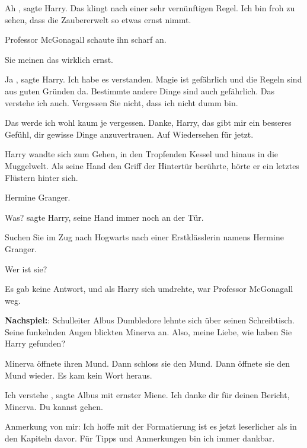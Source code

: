\glqq Ah\grqq{} , sagte Harry. \glqq Das klingt nach einer sehr vernünftigen
Regel. Ich bin froh zu sehen, dass die Zaubererwelt so etwas ernst
nimmt.\grqq{}

Professor McGonagall schaute ihn scharf an.

\glqq Sie meinen das wirklich ernst.\grqq{}

\glqq Ja\grqq{} , sagte Harry. \glqq Ich habe es verstanden. Magie ist
gefährlich und die Regeln sind aus guten Gründen da. Bestimmte andere Dinge
sind auch gefährlich. Das verstehe ich auch. Vergessen Sie nicht, dass ich
nicht dumm bin.\grqq{}

\glqq Das werde ich wohl kaum je vergessen. Danke, Harry, das gibt mir ein
besseres Gefühl, dir gewisse Dinge anzuvertrauen. Auf Wiedersehen für
jetzt.\grqq{}

Harry wandte sich zum Gehen, in den Tropfenden Kessel und hinaus in die
Muggelwelt. Als seine Hand den Griff der Hintertür berührte, hörte er ein
letztes Flüstern hinter sich.

\glqq Hermine Granger.\grqq{}

\glqq Was?\grqq{} sagte Harry, seine Hand immer noch an der Tür.

\glqq Suchen Sie im Zug nach Hogwarts nach einer Erstklässlerin namens Hermine
Granger.\grqq{}

\glqq Wer ist sie?\grqq{}

Es gab keine Antwort, und als Harry sich umdrehte, war Professor McGonagall weg.

\textbf{Nachspiel:}: Schulleiter Albus Dumbledore lehnte sich über
seinen Schreibtisch. Seine funkelnden Augen blickten Minerva an. \glqq Also,
meine Liebe, wie haben Sie Harry gefunden?\grqq{}

Minerva öffnete ihren Mund. Dann schloss sie den Mund. Dann öffnete sie den Mund
wieder. Es kam kein Wort heraus.

\glqq Ich verstehe\grqq{} , sagte Albus mit ernster Miene. \glqq Ich danke dir
für deinen Bericht, Minerva. Du kannst gehen.\grqq{}

Anmerkung von mir: Ich hoffe mit der Formatierung ist es jetzt leserlicher als
in den Kapiteln davor. Für Tipps und Anmerkungen bin ich immer dankbar.